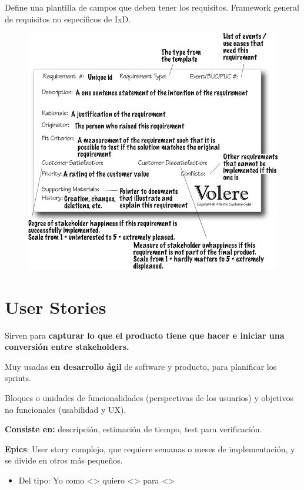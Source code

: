 \documentclass[12pt, twoside, openright]{report} %
\begin{document}
Define una plantilla de campos que deben tener los requisitos. Framework
general de requisitos no específicos de IxD.
\begin{figure}[H]
	{\includegraphics[scale=.4]{2_9_volere_snow_card_alt.jpg}}
\end{figure}

\section{User Stories}

Sirven para \textbf{capturar lo que el producto tiene que hacer e iniciar
	una conversión entre stakeholders.}

Muy usadas \textbf{en desarrollo ágil} de software y producto, para
planificar los sprints.

Bloques o unidades de funcionalidades (perspectivas de los usuarios) y
objetivos no funcionales (usabilidad y UX).

\textbf{Consiste en:} descripción, estimación de tiempo, test para
verificación.

\textbf{Epics}: User story complejo, que requiere semanas o meses de
implementación, y se divide en otros más pequeños.

\begin{itemize}
	\item Del tipo: Yo como \textless\textgreater{} quiero
	      \textless\textgreater{} para \textless\textgreater{}
\end{itemize}
\end{document}
